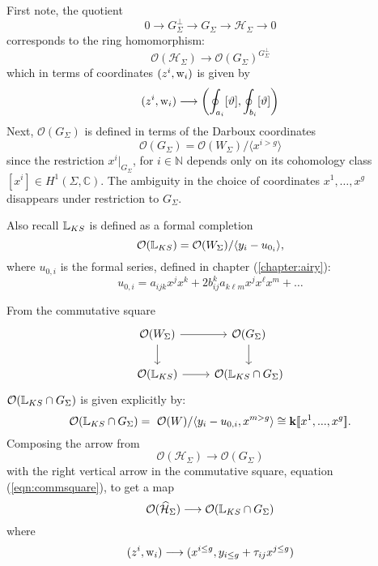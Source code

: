     First note, the quotient
    \[ 0 \rightarrow G_\Sigma^\perp \rightarrow G_\Sigma \rightarrow \mathcal{H}_\Sigma \rightarrow 0  \]
    corresponds to the ring homomorphism:
    \[ 
    \mathcal{O}(\mathcal{H}_\Sigma)    \longrightarrow   \mathcal{O}({G_\Sigma})^{G_\Sigma^\perp}\] 
    which in terms of coordinates \(( z^i, \mathrm{w}_i )\) is given by 
    \[ 
    (z^i,\mathrm{w}_i) \longrightarrow     \left(\oint_{a_i}[\vartheta],\oint_{b_i}[\vartheta]\right)\]
    Next, \( \mathcal{O}(G_\Sigma)\) is defined in terms of the Darboux coordinates 
    \[ 
    \mathcal{O}(G_\Sigma) =\mathcal{O}(W_\Sigma)/\langle x^{i>g} \rangle 
    \] 
    since the restriction \(x^i |_{G_\Sigma}\), for \(i\in\mathbb{N}\) depends only on its cohomology class \([x^i]\in H^1(\Sigma, \mathbb{C})\). The ambiguity in the choice of coordinates \(x^1,\dots,x^g\) disappears under restriction to \(G_\Sigma\).  
    
    Also recall \( \mathbb{L}_{KS}\) is defined as a formal completion
    \[ 
    \mathcal{O}(\mathbb{L}_{KS}) =\mathcal{O}(W_\Sigma ) /\langle y_i - u_{0_i}\rangle ,
    \] 
    where \( u_{0,i}\) is the formal series, defined in chapter (\ref{chapter:airy}):
    \[ u_{0,i} = a_{ijk}x^jx^k+2b_{ij}^ka_{k\ell m}x^jx^\ell x^m+ \dots \]
    
    From the commutative square
    \begin{equation}
    \label{eqn:commsquare}
    \begin{tikzcd}
         \mathcal{O}(W_\Sigma) \arrow[r] \arrow[d] & \mathcal{O}(G_\Sigma)\arrow[d]\\
    \mathcal{O}(\cL_{KS}) \arrow[r] & \mathcal{O}(\cL_{KS} \cap G_\Sigma) 
    \end{tikzcd}
    \end{equation}
    \(\mathcal{O}(\mathbb{L}_{KS}\cap G_\Sigma )\) is given explicitly by:
    \[
    \mathcal{O}(\cL_{KS}\cap G_\Sigma )=\ \mathcal{O}(W) / \langle y_i-u_{0,i} , x^{m>g} \rangle \cong \mathbf{k} \lBrack x^1,...,x^g \rBrack.
    \] 
    Composing the arrow from \[ \mathcal{O}(\mathcal{H}_\Sigma) \rightarrow  \mathcal{O} (G_\Sigma) \]
    with the right vertical arrow in the commutative square, equation (\ref{eqn:commsquare}), to get
    a map 
    \begin{equation}            
    \label{eqn:BLcorr}
    \mathcal{O}(\widehat{\mathcal{H}}_\Sigma) \longrightarrow \mathcal{O}(\mathbb{L}_{KS}\cap G_\Sigma)  
    \end{equation} 
    where 
    \[ 
    (z^i,\mathrm{w}_i)\longrightarrow (x^{i \leq g},y_{i\leq g}+\tau_{ij}x^{j \leq g})
     \] 
      

